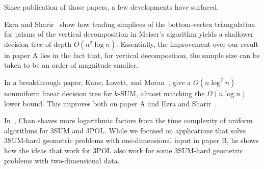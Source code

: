 Since publication of those papers, a few developments have surfaced.

Ezra and Sharir~\cite{ES17} show how trading simplices of the bottom-vertex
triangulation for prisms of the vertical decomposition in Meiser's algorithm
yields a shallower decision tree of depth \(O(n^2 \log n)\). Essentially, the
improvement over our result in paper A lies in the fact that,
for vertical decomposition, the sample size can be taken to be an order of
magnitude smaller.



In a breakthrough paper, Kane, Lovett, and Moran~\cite{KLM18}, give a
\(O(n \log^2 n)\) nonuniform linear decision tree for \(k\)-SUM, almost
matching the \(\Omega(n \log n)\) lower bound. This improves both on paper A
and Ezra and Sharir~\cite{ES17}.

In~\cite{Ch18}, Chan shaves more logarithmic factors from the time complexity
of uniform algorithms for 3SUM and 3POL. While we focused on applications that solve
3SUM-hard geometric problems with one-dimensional input in paper B, he shows how
the ideas that work for 3POL also work for some 3SUM-hard geometric problems
with two-dimensional data.
